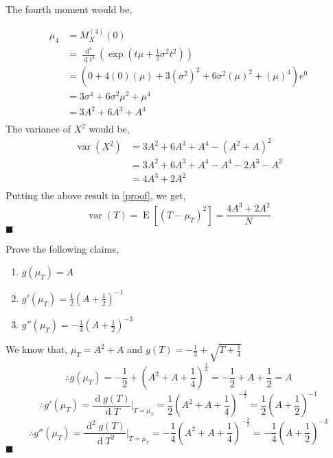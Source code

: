 \documentclass{exam}
\theoremstyle{mytheoremstyle}
\theoremstyle{mytheoremstyle}
\theoremstyle{myproblemstyle}
\begin{document}
\begin{questions}
\begin{solution}
		The fourth moment would be,

		\begin{equation*}
			\begin{split}
				\mu_4&=M^{(4)}_{X}(0)\\
				&=\frac{\operatorname{d}^{4}}{\operatorname{d}t^{4}}\left(\exp{\left(t\mu+\frac{1}{2}\sigma^2t^2\right)}\right)\\
				&=\left(0+4(0)(\mu)+3\left(\sigma^{2}\right)^2+6\sigma^{2}(\mu)^2+(\mu)^{4}\right)e^{0}\\
				&=3\sigma^{4}+6\sigma^{2}\mu^2+\mu^{4}\\
				&=3A^{2}+6A^3+A^{4}\\
			\end{split}
		\end{equation*}
		The variance of \(X^2\) would be,
		\begin{equation*}
			\begin{split}
				\operatorname{var}\left(X^{2}\right)&=3A^{2}+6A^3+A^{4}-\left(A^2+A\right)^2\\
				&=3A^{2}+6A^3+A^{4}-A^{4}-2A^{3}-A^{2}\\
				&=4A^{3}+2A^{2}\\
			\end{split}
		\end{equation*}
		Putting the above result in \eqref{proof}, we get,
		\[\operatorname{var}(T)=\operatorname{E}\left[\left(T-\mu_{T}\right)^{2}\right]=\frac{4A^{3}+2A^{2}}{N}\]
		\center \(\blacksquare\)
	\end{solution}

	\newpage

	\question Prove the following claims,
	\begin{enumerate}
		\item \(g(\mu_{T})=A\)
		\item \(\displaystyle g'(\mu_{T})=\frac{1}{2}\left(A+\frac{1}{2}\right)^{-1}\)
		\item \(\displaystyle g''(\mu_{T})=-\frac{1}{4}\left(A+\frac{1}{2}\right)^{-3}\)
	\end{enumerate}

	\begin{solution}
		We know that, \(\mu_{T}=A^{2}+A\) and \(\displaystyle g(T)=-\frac{1}{2}+\sqrt{T+\frac{1}{4}}\)
		\[\therefore g(\mu_{T})=-\frac{1}{2}+\left(A^{2}+A+\frac{1}{4}\right)^{\frac{1}{2}}=-\frac{1}{2}+A+\frac{1}{2}=A\]
		\[\therefore g'(\mu_{T})=\frac{\operatorname{d}g(T)}{\operatorname{d}T}\bigg|_{T=\mu_{T}}=\frac{1}{2}\left(A^{2}+A+\frac{1}{4}\right)^{-\frac{1}{2}}=\frac{1}{2}\left(A+\frac{1}{2}\right)^{-1}\]
		\[\therefore g''(\mu_{T})=\frac{\operatorname{d}^{2}g(T)}{\operatorname{d}T^{2}}\bigg|_{T=\mu_{T}}=-\frac{1}{4}\left(A^{2}+A+\frac{1}{4}\right)^{-\frac{3}{2}}=-\frac{1}{4}\left(A+\frac{1}{2}\right)^{-3}\]
		\center \(\blacksquare\)
	\end{solution}


\end{questions}
\end{document}
